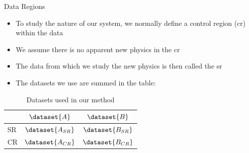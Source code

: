 \documentclass[notheorems]{beamer}
\begin{document}
\begin{frame}{Data Regions}
    \begin{itemize}
        \item To study the nature of our system, we normally define a control region (\gls{cr}) within the data
        \item We assume there is no apparent new physics in the \gls{cr}
        \item The data from which we study the new physics is then called the \gls{sr}
        \item The datasets we use are summed in the table:
        \end{itemize}
    \begin{table}[ht]%
        \caption{\label{table:division_of_data}}
        \begin{tabular}{| l | c | c |}
            & $\dataset{A}$ & $\dataset{B}$ \\
            \hline
            SR & $\dataset{A_{SR}}$ & $\dataset{B_{SR}}$ \\
            CR & $\dataset{A_{CR}}$ & $\dataset{B_{CR}}$ \\
            \end{tabular}
        \caption{Datasets used in our method}
    \end{table}
\end{frame}
\end{document}
